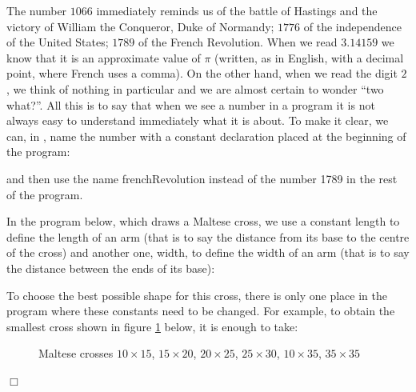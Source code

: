The number $1066$ immediately reminds us of the battle of Hastings and the victory of William the Conqueror, Duke of Normandy;
$1776$ of the independence of the United States; $1789$ of the French
Revolution. When we read $3.14159$ we know that it is an approximate value of $\pi$
(written, as in English, with a decimal point, where French uses a comma).
On the other hand, when we read the digit $2$, we think of nothing in particular and we are almost certain
to wonder
``two what?''.
All this is to say that when we see a number in a
program it is not always easy to understand immediately what it is about. To make it clear,
we can, in \python, name the number with a constant declaration placed at the
beginning of the program:

{
\parindent {}
\medskip

\vspace{\neglskip}\mbox{}\par

\medskip }

\noindent and then use the name {\idt frenchRevolution} instead of the number
{\small\rm 1789} in the rest of the program.


\begin{exemple}{\rm
In the program below, which draws a Maltese cross, we
use a constant {\idt length} to define the length of an
arm (that is to say the distance from its base to the centre of the cross) and
another one, {\idt width}, to define the width of an arm
(that is to say the distance between the ends of its base):\hfill\\[22mm]
%
\vspace*{-22mm}%


To choose the best possible shape for
this cross, there is only one place in the program where these constants
need to be changed. For example, to obtain the smallest cross shown in
figure \ref{fig:crmadiff} below, it is enough to take:\par
{
\parindent {}
\medskip

\vspace{\neglskip}\mbox{}\par
\vspace{\neglskip}\mbox{}\par

\medskip }
\begin{figure}[htbp]
 \caption{Maltese crosses $10\times 15$, $15\times 20$, $20\times 25$, $25\times 30$,
 $10\times 35$, $35\times 35$}
 \label{fig:crmadiff}
\end{figure}
\noindent $\Box$ }\end{exemple}

